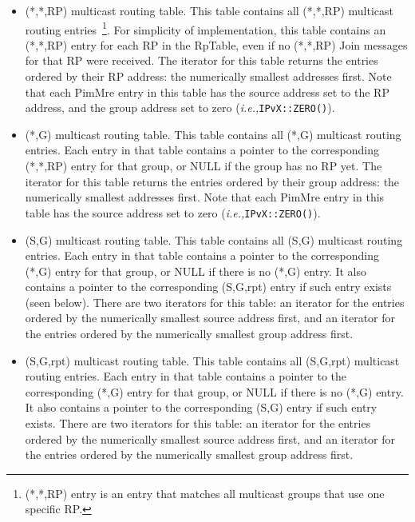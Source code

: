 \documentclass[11pt]{article}
\newcommand{\ie}{\emph{i.e.,}\xspace}
\begin{document}
\begin{itemize}

  \item (*,*,RP) multicast routing table. This table contains all
  (*,*,RP) multicast routing entries~\footnote{(*,*,RP) entry is an
  entry that matches all multicast groups that use one specific
  RP.}. For simplicity of implementation, this table contains an
  (*,*,RP) entry for each RP in the RpTable, even if no (*,*,RP) Join
  messages for that RP were received.  The iterator for this table
  returns the entries ordered by their RP address: the numerically
  smallest addresses first. Note that each PimMre entry in this table
  has the source address set to the RP address, and the group address
  set to zero (\ie \verb=IPvX::ZERO()=).

  \item (*,G) multicast routing table. This table contains all (*,G)
  multicast routing entries. Each entry in that table contains a pointer
  to the corresponding (*,*,RP) entry for that group, or NULL if the
  group has no RP yet. The iterator for this table returns the entries
  ordered by their group address: the numerically smallest addresses
  first. Note that each PimMre entry in this table has the source
  address set to zero (\ie \verb=IPvX::ZERO()=).

  \item (S,G) multicast routing table. This table contains all (S,G)
  multicast routing entries. Each entry in that table contains a pointer
  to the corresponding (*,G) entry for that group, or NULL if there is
  no (*,G) entry. It also contains a pointer to the corresponding
  (S,G,rpt) entry if such entry exists (seen below). There are two iterators
  for this table: an iterator for the entries ordered by the numerically
  smallest source address first, and an iterator for the entries ordered
  by the numerically smallest group address first.

  \item (S,G,rpt) multicast routing table. This table contains all
  (S,G,rpt) multicast routing entries. Each entry in that table contains
  a pointer to the corresponding (*,G) entry for that group, or NULL if
  there is no (*,G) entry. It also contains a pointer to the
  corresponding (S,G) entry if such entry exists. There are two
  iterators for this table: an iterator for the entries ordered by the
  numerically smallest source address first, and an iterator for the
  entries ordered by the numerically smallest group address first.

\end{itemize}
\end{document}
